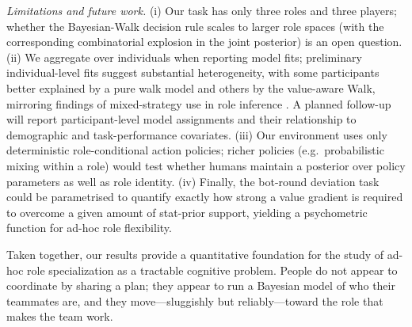 \documentclass[9pt,twocolumn,twoside]{pnas-new}
\begin{document}
\emph{Limitations and future work.} (i) Our task has only three roles
and three players; whether the Bayesian-Walk decision rule scales to
larger role spaces (with the corresponding combinatorial explosion in
the joint posterior) is an open question. (ii) We aggregate over
individuals when reporting model fits; preliminary individual-level
fits suggest substantial heterogeneity, with some participants better
explained by a pure walk model and others by the value-aware Walk,
mirroring findings of mixed-strategy use in role inference
\cite{bakerPeopleUseMixed2025}. A planned follow-up will report
participant-level model assignments and their relationship to
demographic and task-performance covariates. (iii) Our environment uses
only deterministic role-conditional action policies; richer policies
(e.g.\ probabilistic mixing within a role) would test whether humans
maintain a posterior over policy parameters as well as role identity.
(iv) Finally, the bot-round deviation task could be parametrised to
quantify exactly how strong a value gradient is required to overcome a
given amount of stat-prior support, yielding a psychometric function for
ad-hoc role flexibility.

Taken together, our results provide a quantitative foundation for the
study of ad-hoc role specialization as a tractable cognitive
problem. People do not appear to coordinate by sharing a plan; they
appear to run a Bayesian model of who their teammates are, and they
move---sluggishly but reliably---toward the role that makes the team
work.
\end{document}
